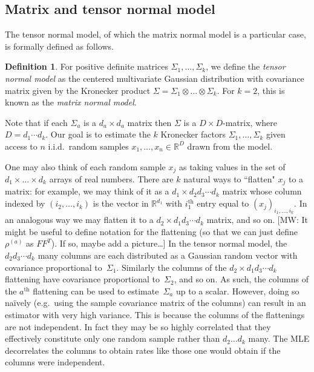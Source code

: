 \documentclass[aos]{imsart}
\theoremstyle{definition}
\newtheorem{definition}[theorem]{Definition}
\numberwithin{equation}{section}
\newcommand{\R}{{\mathbb{R}}}
\newcommand{\ot}{\otimes}
\newcommand{\MW}[1]{{\color{red}[MW: #1]}}
\begin{document}
\subsection{Matrix and tensor normal model}
The tensor normal model, of which the matrix normal model is a particular case, is formally defined as follows.

\begin{definition}
For positive definite matrices $\Sigma_1,\dots,\Sigma_k$, we define the \emph{tensor normal model} as the centered multivariate Gaussian distribution with covariance matrix given by the Kronecker product $\Sigma = \Sigma_1 \ot \dots \ot \Sigma_k$.
For $k=2$, this is known as the \emph{matrix normal model}.
\end{definition}

\noindent
Note that if each $\Sigma_a$ is a $d_a\times d_a$ matrix then $\Sigma$ is a $D\times D$-matrix, where $D=d_1 \cdots d_k$.
Our goal is to estimate the $k$ Kronecker factors $\Sigma_1, \dots, \Sigma_k$ given access to $n$ i.i.d.\ random samples $x_1, \dots, x_n \in \R^D$ drawn from the model.

One may also think of each random sample $x_j$ as taking values in the set of $d_1 \times \dots \times d_k$ arrays of real numbers.
There are $k$ natural ways to ``flatten" $x_j$ to a matrix:
for example, we may think of it as a $d_1 \times d_2d_3\cdots{}d_k$ matrix whose column indexed by $(i_2,\dots, i_k)$ is the vector in $\R^{d_1}$ with $i_1^{\text{th}}$ entry equal to $(x_j)_{i_1, \dots, i_k}$.
In an analogous way we may flatten it to a $d_2 \times d_1d_3\cdots{}d_k$ matrix, and so on.
\MW{It might be useful to define notation for the flattening (so that we can just define $\rho^{(a)}$ as $FF^T$). If so, maybe add a picture\dots}
In the tensor normal model, the $d_2d_3\cdots{}d_k$ many columns are each distributed as a Gaussian random vector with covariance proportional to~$\Sigma_1$.
Similarly the columns of the $d_2 \times d_1d_3\cdots{}d_k$ flattening have covariance proportional to~$\Sigma_2$, and so on.
As such, the columns of the $a^{\text{th}}$ flattening can be used to estimate~$\Sigma_a$ up to a scalar.
However, doing so na\"ively (e.g.\ using the sample covariance matrix of the columns) can result in an estimator with very high variance.
This is because the columns of the flattenings are not independent.
In fact they may be so highly correlated that they effectively constitute only one random sample rather than $d_2\dots d_k$ many.
The MLE decorrelates the columns to obtain rates like those one would obtain if the columns were independent.
\end{document}

